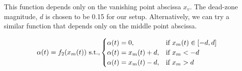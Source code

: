 This function depends only on the vanishing point abscissa $x_v$. The dead-zone magnitude, $d$ is chosen to be 0.15 for our setup. Alternatively, we can try a similar function that depends only on the middle point abscissa.

\begin{equation}
\alpha(t) = f_2(x_m(t)) \text{ s.t.,} \\
\begin{cases}
\alpha(t) = 0,&\text{if }x_m(t)\in[-d,d]\\
\alpha(t) = x_m(t)+d,&\text{if }x_m<-d\\
\alpha(t) = x_m(t)-d,&\text{if }x_m>d
\end{cases}
\label{eq:f2}
\end{equation}









